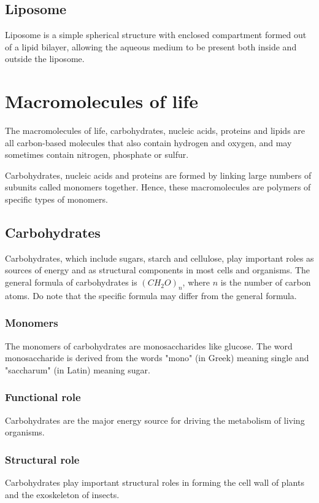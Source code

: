 \documentclass[11pt]{article}
\begin{document}
\subsection{Liposome}
\label{sec:orgfc6cf8f}
Liposome is a simple spherical structure with enclosed compartment formed out of a lipid bilayer, allowing the aqueous medium to be present both inside and outside the liposome.
\section{Macromolecules of life}
\label{sec:org36db7f7}
The macromolecules of life, carbohydrates, nucleic acids, proteins and lipids are all carbon-based molecules that also contain hydrogen and oxygen, and may sometimes contain nitrogen, phosphate or sulfur.


Carbohydrates, nucleic acids and proteins are formed by linking large numbers of subunits called monomers together. Hence, these macromolecules are polymers of specific types of monomers.
\subsection{Carbohydrates}
\label{sec:org5081477}
Carbohydrates, which include sugars, starch and cellulose, play important roles as sources of energy and as structural components in most cells and organisms. The general formula of carbohydrates is \((CH_2O)_n\), where \(n\) is the number of carbon atoms. Do note that the specific formula may differ from the general formula.
\subsubsection{Monomers}
\label{sec:orgbaa34d1}
The monomers of carbohydrates are monosaccharides like glucose. The word monosaccharide is derived from the words "mono" (in Greek) meaning single and "saccharum" (in Latin) meaning sugar.
\subsubsection{Functional role}
\label{sec:orgdfc4727}
Carbohydrates are the major energy source for driving the metabolism of living organisms.
\subsubsection{Structural role}
\label{sec:org16d9b32}
Carbohydrates play important structural roles in forming the cell wall of plants and the exoskeleton of insects.
\end{document}
